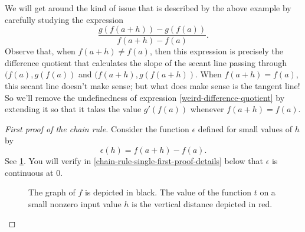 We will get around the kind of issue that is described by the above example by carefully studying the expression
\begin{equation} \label{weird-difference-quotient} \frac{g(f(a+h)) - g(f(a))}{f(a+h)-f(a)}. \end{equation}
Observe that, when $f(a+h)\neq f(a)$, then this expression is precisely the difference quotient that calculates the slope of the secant line passing through $(f(a), g(f(a))$ and $(f(a+h), g(f(a+h))$. When $f(a+h) = f(a)$, this secant line doesn't make sense; but what does make sense is the tangent line! So we'll remove the undefinedness of expression \eqref{weird-difference-quotient} by extending it so that it takes the value $g'(f(a))$ whenever $f(a+h) = f(a)$. 

\begin{proof}[First proof of the chain rule]
	Consider the function $\epsilon$ defined for small values of $h$ by \[ \epsilon(h) = f(a+h)-f(a). \]
	See \cref{value-difference-chain-rule}. You will verify in \cref{chain-rule-single-first-proof-details} below that $\epsilon$ is continuous at 0. 
	
	\begin{figure}[t]
		\begin{center}
		\end{center}
		\caption{The graph of $f$ is depicted in black. The value of the function $t$ on a small nonzero input value $h$ is the vertical distance depicted in red.}  \label{value-difference-chain-rule}
	\end{figure}


\end{proof}
